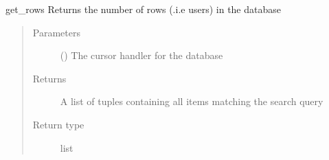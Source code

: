 \documentclass[letterpaper,10pt,english]{sphinxmanual}
\begin{document}

\begin{fulllineitems}
\label{\detokenize{flaskapp.data:flaskapp.data.database.get_rows}}
get\_rows Returns the number of rows (.i.e users) in the database
\begin{quote}\begin{description}
\item[{Parameters}] \leavevmode
{} () \textendash{} The cursor handler for the database

\item[{Returns}] \leavevmode
A list of tuples containing all items matching the search query

\item[{Return type}] \leavevmode
list

\end{description}\end{quote}

\end{fulllineitems}

\end{document}

